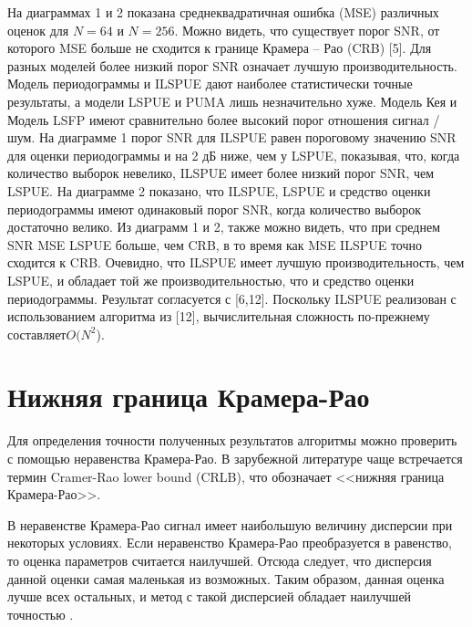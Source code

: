 На диаграммах 1 и 2 показана среднеквадратичная ошибка (MSE) различных оценок для $N = 64$ и $N = 256$. Можно видеть, что существует порог SNR, от которого MSE больше не сходится к границе Крамера – Рао (CRB) [5]. Для разных моделей более низкий порог SNR означает лучшую производительность. Модель периодограммы и ILSPUE дают наиболее статистически точные результаты, а модели LSPUE и PUMA лишь незначительно хуже. Модель Кея и Модель LSFP имеют сравнительно более высокий порог отношения сигнал / шум. На диаграмме 1 порог SNR для ILSPUE равен пороговому значению SNR для оценки периодограммы и на 2 дБ ниже, чем у LSPUE, показывая, что, когда количество выборок невелико, ILSPUE имеет более низкий порог SNR, чем LSPUE. На диаграмме 2 показано, что ILSPUE, LSPUE и средство оценки периодограммы имеют одинаковый порог SNR, когда количество выборок достаточно велико. Из диаграмм 1 и 2, также можно видеть, что при среднем SNR MSE LSPUE больше, чем CRB, в то время как MSE ILSPUE точно сходится к CRB. Очевидно, что ILSPUE имеет лучшую производительность, чем LSPUE, и обладает той же производительностью, что и средство оценки периодограммы. Результат согласуется с [6,12]. Поскольку ILSPUE реализован с использованием алгоритма из [12], вычислительная сложность по-прежнему составляет$ O(N^2$).


\section{Нижняя граница Крамера-Рао} \label{sec:ch1/sec5}

Для определения точности полученных результатов алгоритмы можно проверить с помощью неравенства Крамера-Рао. В зарубежной литературе чаще встречается термин Cramer-Rao lower bound (CRLB), что обозначает <<нижняя граница Крамера-Рао>>. 

В неравенстве Крамера-Рао сигнал имеет наибольшую величину дисперсии при некоторых условиях. Если неравенство Крамера-Рао преобразуется в равенство, то оценка параметров считается наилучшей. Отсюда следует, что дисперсия данной оценки самая маленькая из возможных. Таким образом, данная оценка лучше всех остальных, и метод с такой дисперсией обладает наилучшей точностью \cite{4515960, 343082, kay1993fundamentals, 1439205, 668800, tran1990cramer}.



